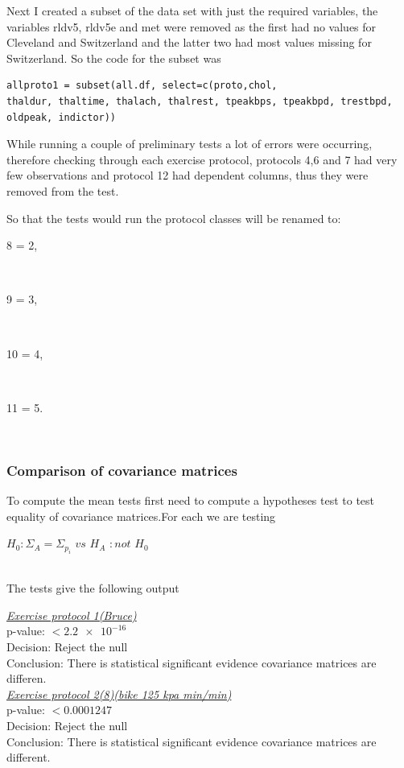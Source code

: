 \documentclass[a4paper]{article}
\begin{document}
Next I created a subset of the data set with just the required variables, the variables rldv5, rldv5e and met were removed as the first had no values for Cleveland and Switzerland and the latter two had most values missing for Switzerland. So the code for the subset was
\begin{lstlisting}[frame=single]
allproto1 = subset(all.df, select=c(proto,chol,
thaldur, thaltime, thalach, thalrest, tpeakbps, tpeakbpd, trestbpd,
oldpeak, indictor))
\end{lstlisting}

While running a couple of preliminary tests a lot of errors were occurring, therefore checking through each exercise protocol, protocols 4,6 and 7 had very few observations and protocol 12 had dependent columns, thus they were removed from the test.

So that the tests would run the protocol classes will be renamed to:\\
\centerline{8 = 2,}\\
\centerline{9 = 3,}\\
\centerline{10 = 4,}\\
\centerline{11 = 5.}\\

\newpage
\subsubsection{Comparison of covariance matrices}
To compute the mean tests first need to compute a hypotheses test to test equality of covariance matrices.For each we are testing\\ 
\centerline{ $H_0 : \Sigma_A = \Sigma_{p_i}$ $vs$ $H_A $ $: not$  $H_0$}\\
The tests give the following output



\underline{\textit{Exercise protocol 1(Bruce)}}\\
p-value: $< \num{2.2e-16}$\\
Decision: Reject the null\\
Conclusion: There is statistical significant evidence covariance matrices 
are differen.\\


\underline{\textit{Exercise protocol 2(8)(bike 125 kpa min/min)}}\\
p-value: $< \num{0.0001247}$\\
Decision: Reject the null\\
Conclusion: There is statistical significant evidence covariance matrices 
are different.\\
\end{document}
